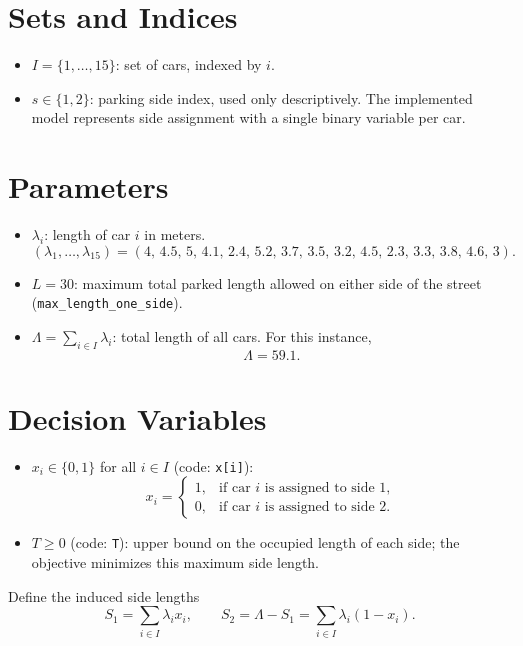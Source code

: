 \section*{Sets and Indices}

\begin{itemize}
    \item $I = \{1,\dots,15\}$: set of cars, indexed by $i$.
    \item $s \in \{1,2\}$: parking side index, used only descriptively. The implemented model represents side assignment with a single binary variable per car.
\end{itemize}

\section*{Parameters}

\begin{itemize}
    \item $\lambda_i$: length of car $i$ in meters.
    \[
    (\lambda_1,\ldots,\lambda_{15}) = (4,\,4.5,\,5,\,4.1,\,2.4,\,5.2,\,3.7,\,3.5,\,3.2,\,4.5,\,2.3,\,3.3,\,3.8,\,4.6,\,3).
    \]
    \item $L = 30$: maximum total parked length allowed on either side of the street (\texttt{max\_length\_one\_side}).
    \item $\Lambda = \sum_{i \in I} \lambda_i$: total length of all cars. For this instance,
    \[
    \Lambda = 59.1.
    \]
\end{itemize}

\section*{Decision Variables}

\begin{itemize}
    \item $x_i \in \{0,1\}$ for all $i \in I$ (code: \texttt{x[i]}):
    \[
    x_i = 
    \begin{cases}
    1, & \text{if car } i \text{ is assigned to side 1},\\
    0, & \text{if car } i \text{ is assigned to side 2}.
    \end{cases}
    \]
    \item $T \ge 0$ (code: \texttt{T}): upper bound on the occupied length of each side; the objective minimizes this maximum side length.
\end{itemize}

Define the induced side lengths
\[
S_1 = \sum_{i \in I} \lambda_i x_i,
\qquad
S_2 = \Lambda - S_1 = \sum_{i \in I} \lambda_i(1-x_i).
\]

